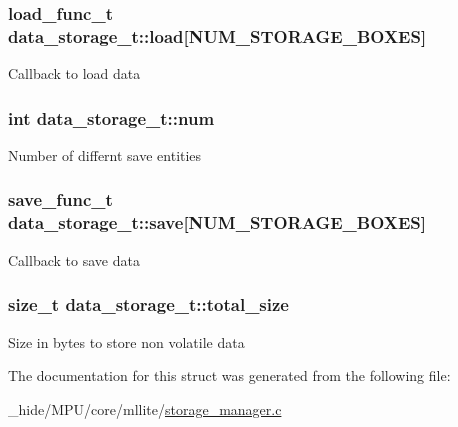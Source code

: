 \subsubsection[{load}]{\setlength{\rightskip}{0pt plus 5cm}load\+\_\+func\+\_\+t data\+\_\+storage\+\_\+t\+::load\mbox{[}{\bf N\+U\+M\+\_\+\+S\+T\+O\+R\+A\+G\+E\+\_\+\+B\+O\+X\+E\+S}\mbox{]}}\label{structdata__storage__t_a99ed11f9a4229d903e7de3eef418fd0a}
Callback to load data \hypertarget{structdata__storage__t_ac037eddc51ffd2acc13db6cd92257cc2}{}
\subsubsection[{num}]{\setlength{\rightskip}{0pt plus 5cm}int data\+\_\+storage\+\_\+t\+::num}\label{structdata__storage__t_ac037eddc51ffd2acc13db6cd92257cc2}
Number of differnt save entities \hypertarget{structdata__storage__t_afd928f17cd46fb954c84d78a0a922e6d}{}
\subsubsection[{save}]{\setlength{\rightskip}{0pt plus 5cm}save\+\_\+func\+\_\+t data\+\_\+storage\+\_\+t\+::save\mbox{[}{\bf N\+U\+M\+\_\+\+S\+T\+O\+R\+A\+G\+E\+\_\+\+B\+O\+X\+E\+S}\mbox{]}}\label{structdata__storage__t_afd928f17cd46fb954c84d78a0a922e6d}
Callback to save data \hypertarget{structdata__storage__t_a0d1c5c0c397a51fff922c8406cff4374}{}
\subsubsection[{total\+\_\+size}]{\setlength{\rightskip}{0pt plus 5cm}size\+\_\+t data\+\_\+storage\+\_\+t\+::total\+\_\+size}\label{structdata__storage__t_a0d1c5c0c397a51fff922c8406cff4374}
Size in bytes to store non volatile data 

The documentation for this struct was generated from the following file\+:\begin{DoxyCompactItemize}
\item 
\+\_\+hide/\+M\+P\+U/core/mllite/\hyperlink{storage__manager_8c}{storage\+\_\+manager.\+c}\end{DoxyCompactItemize}
